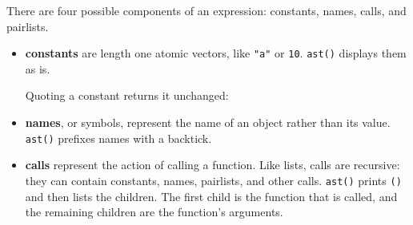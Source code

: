 There are four possible components of an expression: constants, names,
calls, and pairlists.

\begin{itemize}
\item
  \textbf{constants} are length one atomic vectors, like \texttt{"a"} or
  \texttt{10}. \texttt{ast()} displays them as is. 

\begin{Shaded}
\begin{Highlighting}[]
\NormalTok{(}\NormalTok{)}
\NormalTok{(}\NormalTok{)}
\NormalTok{(}\NormalTok{)}
\end{Highlighting}
\end{Shaded}

  Quoting a constant returns it unchanged:

\begin{Shaded}
\begin{Highlighting}[]
\NormalTok{(}\NormalTok{, }\NormalTok{(}\NormalTok{))}
\NormalTok{(}\NormalTok{, }\NormalTok{(}\NormalTok{))}
\end{Highlighting}
\end{Shaded}
\item
  \textbf{names}, or symbols, represent the name of an object rather
  than its value. \texttt{ast()} prefixes names with a backtick.
   

\begin{Shaded}
\begin{Highlighting}[]
\NormalTok{(}\NormalTok{)}
\end{Highlighting}
\end{Shaded}
\item
  \textbf{calls} represent the action of calling a function. Like lists,
  calls are recursive: they can contain constants, names, pairlists, and
  other calls. \texttt{ast()} prints \texttt{()} and then lists the
  children. The first child is the function that is called, and the
  remaining children are the function's arguments. 


\end{itemize}
